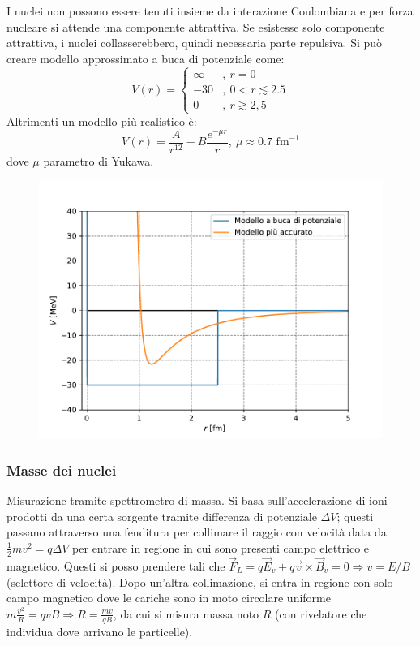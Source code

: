 \documentclass[10pt, a4paper]{scrartcl}
\numberwithin{equation}{subsection}
\theoremstyle{style1}
\begin{document}
I nuclei non possono essere tenuti insieme da interazione Coulombiana e per forza nucleare si attende una componente attrattiva. Se esistesse solo componente attrattiva, i nuclei collasserebbero, quindi necessaria parte repulsiva.
Si pu\`o creare modello approssimato a buca di potenziale come:
\begin{equation}
	V(r) = \begin{cases} 
		\infty&, \ r= 0\\ 
		-30 &, \ 0<r\lesssim 2.5\\
		0&,\ r\gtrsim 2,5
	\end{cases}
\end{equation}
Altrimenti un modello pi\`u realistico \`e:
\begin{equation}
	V(r) = \frac{A}{r^{12} } - B \frac{e^{-\mu r} }{r}, \ \mu \approx 0.7 \text{ fm}^{-1} 
\end{equation}
dove $\mu $ parametro di Yukawa. 
\begin{figure}[h!]
	\centering
	\includegraphics[width=.5\columnwidth]{nucpot.pdf}
\end{figure}

\subsubsection{Masse dei nuclei}

Misurazione tramite spettrometro di massa. Si basa sull'accelerazione di ioni prodotti da una certa sorgente tramite differenza di potenziale $\Delta V$; questi passano attraverso una fenditura per collimare il raggio con velocit\`a data da $\frac{1}{2}m v^2 = q\Delta V$ per entrare in regione in cui sono presenti campo elettrico e magnetico. Questi si posso prendere tali che $\vec{F}_L = q \vec{E}_v + q \vec{v}\times \vec{B}_v = 0\Rightarrow v = E / B$ (selettore di velocit\`a). Dopo un'altra collimazione, si entra in regione con solo campo magnetico dove le cariche sono in moto circolare uniforme $m \frac{v^2}{R} = q vB \Rightarrow  R = \frac{mv}{qB}$, da cui si misura massa noto $R$ (con rivelatore che individua dove arrivano le particelle).
\end{document}
